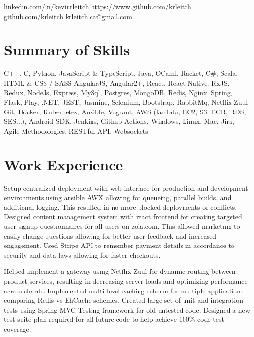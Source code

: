 \documentclass{my_resume}
\begin{document}
        {linkedin.com/in/kevinrleitch}
        {https://www.github.com/krleitch}
        {github.com/krleitch}
        {krleitch.ca@gmail.com}

\section{Summary of Skills}
{C++, C, Python, JavaScript \& TypeScript, Java, OCaml, Racket, C\#, Scala, HTML \& CSS / SASS}
{AngularJS, Angular2+, React, React Native, RxJS, Redux, NodeJs, Express, MySql, Postgres,
 MongoDB, Redis, Nginx, Spring, Flask, Play, .NET, JEST, Jasmine, Selenium, Bootstrap, RabbitMq, Netflix Zuul}
{Git, Docker, Kubernetes, Ansible, Vagrant, AWS (lambda, EC2, S3, ECR, RDS, SES...),
 Android SDK, Jenkins, Github Actions, Windows, Linux, Mac, Jira, Agile Methodologies, RESTful API, Websockets}

\section{Work Experience}

\workitemsthree
{Setup centralized deployment with web interface for production and development environments using ansible AWX allowing for queueing,
 parallel builds, and additional logging. This resulted in no more blocked deployments or conflicts.}
{Designed content management system with react frontend for creating targeted user signup questionnaires for all users on zola.com. This allowed marketing
 to easily change questions allowing for better user feedback and increased engagement.}
{Used Stripe API to remember payment details in accordance to security and data laws allowing for faster checkouts.}

\workitemsthree
{Helped implement a gateway using Netflix Zuul for dynamic routing between product services,
 resulting in decreasing server loads and optimizing performance across shards.}
{Implemented multi-level caching scheme for multiple applications comparing Redis vs EhCache schemes.}
{Created large set of unit and integration tests using Spring MVC Testing framework for old untested code.
 Designed a new test suite plan required for all future code to help achieve 100\% code test coverage.}
\end{document}

